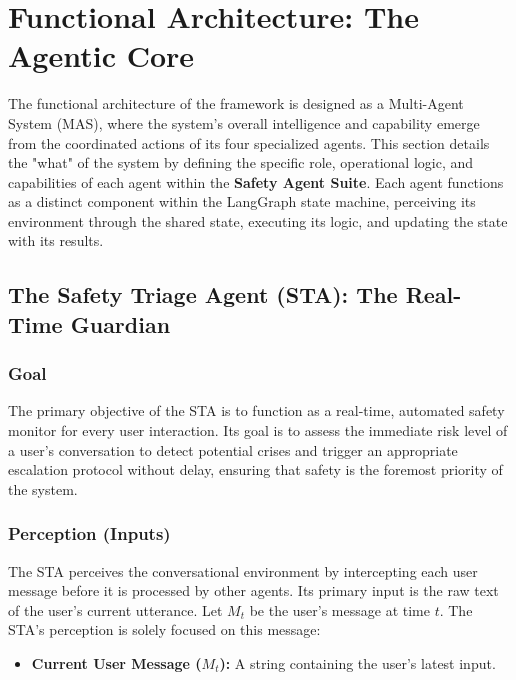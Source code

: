 
\section{Functional Architecture: The Agentic Core}
\label{chap:functional_architecture}

The functional architecture of the framework is designed as a Multi-Agent System (MAS), where the system's overall intelligence and capability emerge from the coordinated actions of its four specialized agents. This section details the "what" of the system by defining the specific role, operational logic, and capabilities of each agent within the \textbf{Safety Agent Suite}. Each agent functions as a distinct component within the LangGraph state machine, perceiving its environment through the shared state, executing its logic, and updating the state with its results.

\subsection{The Safety Triage Agent (STA): The Real-Time Guardian}

\subsubsection{Goal}
The primary objective of the STA is to function as a real-time, automated safety monitor for every user interaction. Its goal is to assess the immediate risk level of a user's conversation to detect potential crises and trigger an appropriate escalation protocol without delay, ensuring that safety is the foremost priority of the system.

\subsubsection{Perception (Inputs)}
The STA perceives the conversational environment by intercepting each user message before it is processed by other agents. Its primary input is the raw text of the user's current utterance. Let $M_t$ be the user's message at time $t$. The STA's perception is solely focused on this message:
\begin{itemize}
    \item \textbf{Current User Message ($M_t$):} A string containing the user's latest input.
\end{itemize}

